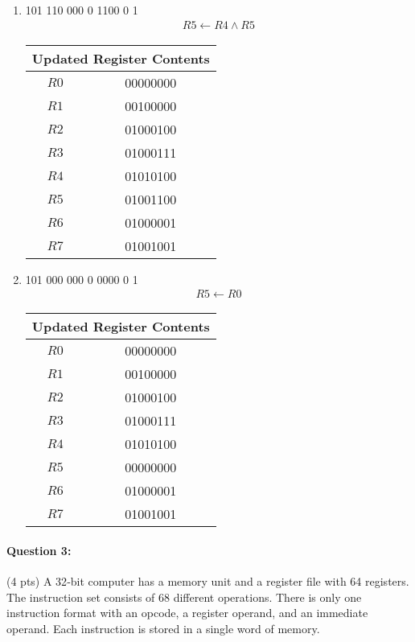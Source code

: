 \documentclass[12pt,letterpaper,titlepage]{report}
\begin{document}
\begin{raggedright}
\begin{multicols}{2}
\begin{enumerate}[noitemsep, label=\alph*)]
\item 101 110 000 0 1100 0 1
\begin{align*}
R5 \gets R4 \land R5
\end{align*}
\begin{center}
\begin{tabular}{|c|c|}\hline 
\multicolumn{2}{|c|}{Updated Register Contents}\\ \hline\hline
$R0$ & 00000000 \\ \hline
$R1$ & 00100000 \\ \hline
$R2$ & 01000100 \\ \hline
$R3$ & 01000111 \\ \hline
$R4$ & 01010100 \\ \hline
$R5$ & 01001100 \\ \hline
$R6$ & 01000001 \\ \hline
$R7$ & 01001001 \\ \hline
\end{tabular}
\end{center}

\item 101 000 000 0 0000 0 1
\begin{align*}
R5 \gets R0
\end{align*}
\begin{center}
\begin{tabular}{|c|c|}\hline 
\multicolumn{2}{|c|}{Updated Register Contents}\\ \hline\hline
$R0$ & 00000000 \\ \hline
$R1$ & 00100000 \\ \hline
$R2$ & 01000100 \\ \hline
$R3$ & 01000111 \\ \hline
$R4$ & 01010100 \\ \hline
$R5$ & 00000000 \\ \hline
$R6$ & 01000001 \\ \hline
$R7$ & 01001001 \\ \hline
\end{tabular}
\end{center}

\end{enumerate}
\end{multicols}
\clearpage

\paragraph{Question 3:}
(4 pts) A 32‐bit computer has a memory unit and a register file with 64 registers. The instruction set consists of 68 different operations. There is only one instruction format with an opcode, a register operand, and an immediate operand. Each instruction is stored in a single word of memory.


\end{raggedright}
\end{document}
